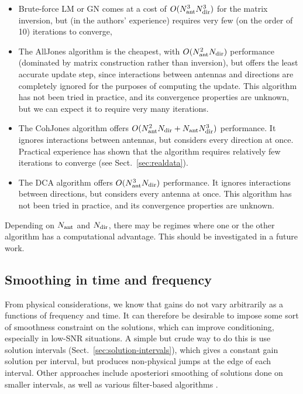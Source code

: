 \documentclass[useAMS,usenatbib]{mn2e}
\begin{document}
\begin{itemize}
\item Brute-force LM or GN comes at a cost of $O(N_\mathrm{ant}^3N_\mathrm{dir}^3)$ for the matrix inversion, but (in the authors' experience) requires
very few (on the order of 10) iterations to converge,
\item The {\sc AllJones} algorithm is the cheapest, with $O(N_\mathrm{ant}^2N_\mathrm{dir})$ performance (dominated by matrix construction rather than inversion), but offers the least accurate update step, since interactions between antennas and directions 
are completely ignored for the purposes of computing the update. This algorithm has not been tried in practice, and its convergence properties are unknown, but we can expect it to require very many iterations.
\item The {\sc CohJones} algorithm offers $O(N_\mathrm{ant}^2N_\mathrm{dir}+N_\mathrm{ant}N_\mathrm{dir}^3)$ performance. It ignores interactions between antennas,
but considers every direction at once. Practical experience has shown that the algorithm
requires relatively few iterations to converge (see Sect.~\ref{sec:realdata}).
\item The {\sc DCA} algorithm offers $O(N_\mathrm{ant}^3N_\mathrm{dir})$ performance. It ignores interactions between directions,
but considers every antenna at once. This algorithm has not been tried in practice, and its convergence properties are unknown.
\end{itemize}

Depending on $N_\mathrm{ant}$ and $N_\mathrm{dir}$, there may be regimes where one or the other algorithm has a computational advantage. This should be investigated in a future work.

\subsection{Smoothing in time and frequency}
\label{sec:DI:smooth}

From physical considerations, we know that gains do not vary arbitrarily as a functions of frequency and time. It can
therefore be desirable to impose some sort of smoothness constraint on the solutions, which can improve conditioning, especially
in low-SNR situations. A simple but crude way to do this is use solution intervals (Sect.~\ref{sec:solution-intervals}),
which gives a constant gain solution per interval, but produces non-physical jumps at the edge of each interval.
Other approaches include aposteriori smoothing of solutions done on smaller intervals, as well as various filter-based 
algorithms \citep{tasse-filters}. 
\end{document}
